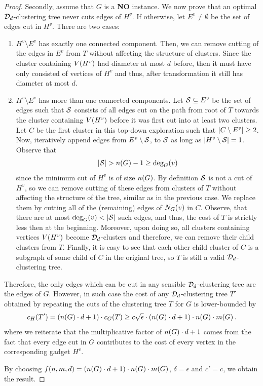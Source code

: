 \begin{proof}
    Secondly, assume that $G$ is a \textbf{NO} instance. We now prove that an optimal $\mathcal{D}_d$-clustering tree never cuts edges of $H^v$. If otherwise, let $E^{v}\neq\emptyset$ be the set of edges cut in $H^v$. There are two cases:
    \begin{enumerate}
        \item $H^v\setminus E^{v}$ has exactly one connected component. Then, we can remove cutting of the edges in $E^{v}$ from $T$ without affecting the structure of clusters. Since the cluster containing $V\mathopen{}\left( H^v \right)$ had diameter at most $d$ before, then it must have only consisted of vertices of $H^v$ and thus, after transformation it still has diameter at most $d$.
        \item $H^v\setminus E^{v}$ has more than one connected components.
        Let $\mathcal{S}\subseteq E^{v}$ be the set of edges such that $\mathcal{S}$ consists of all edges cut on the path from root of $T$ towards the cluster containing $V\mathopen{}\left( H^v \right)$ before it was first cut into at least two clusters.
        Let $C$ be the first cluster in this top-down exploration such that $\mathopen{}\left| C\setminus E^{v} \right|\geq 2$. Now, iteratively append edges from $E^{v}\setminus\mathcal{S}$, to $\mathcal{S}$ as long as $\mathopen{}\left| H^v\setminus \mathcal{S} \right|=1$.
        Observe that 
        \[
        \spr{\cS}> n\br{G} - 1 \geq \deg_G\br{v}
        \]
        since the minimum cut of $H^v$ is of size $n\mathopen{}\left( G \right)$.
         By definition $\mathcal{S}$ is not a cut of $H^v$, so we can remove cutting of these edges from clusters of $T$ without affecting the structure of the tree, similar as in the previous case. We replace them by cutting all of the (remaining) edges of $N_G\mathopen{}\left( v \right)$ in $C$. Observe, that there are at most $\deg_G\mathopen{}\left( v \right)<\mathopen{}\left| \mathcal{S} \right|$ such edges, and thus, the cost of $T$ is strictly less then at the beginning. Moreover, upon doing so, all clusters containing vertices $V\mathopen{}\left( H^v \right)$ become $\mathcal{D}_d$-clusters and therefore, we can remove their child clusters from $T$. Finally, it is easy to see that each other child cluster of $C$ is a subgraph of some child of $C$ in the original tree, so $T$ is still a valid $\mathcal{D}_d$-clustering tree.
        \end{enumerate}

    Therefore, the only edges which can be cut in any sensible $\mathcal{D}_d$-clustering tree are the edges of $G$. However, in such case the cost of any $\mathcal{D}_d$-clustering tree $T'$ obtained by repeating the cuts of the clustering tree $T$ for $G$ is lower-bounded by
    \[
    {c}_H\mathopen{}\left( T' \right) = \mathopen{}\left( n\mathopen{}\left( G \right)\cdot d+1 \right)\cdot{c}_G\mathopen{}\left( T \right) \geq c\sqrt{\epsilon} \cdot \mathopen{}\left( n\mathopen{}\left( G \right)\cdot d+1 \right)\cdot n\mathopen{}\left( G \right)\cdot m\mathopen{}\left( G \right).
    \]
        where we reiterate that the multiplicative factor of $n\mathopen{}\left( G \right)\cdot d+1$ comes from the fact that every edge cut in $G$ contributes to the cost of every vertex in the corresponding gadget $H^v$.

    By choosing $f\mathopen{}\left( n, m, d \right) = \mathopen{}\left( n\mathopen{}\left( G \right)\cdot d+1 \right)\cdot n\mathopen{}\left( G \right)\cdot m\mathopen{}\left( G \right)$, $\delta = \epsilon$ and $c'=c$, we obtain the result.
\end{proof}


